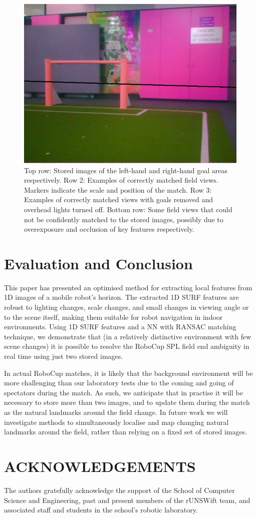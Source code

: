 \documentclass[runningheads,a4paper]{llncs}
\begin{document}
\begin{figure} [h]
\begin{minipage}[b]{0.5\textwidth}
\includegraphics[width=1\textwidth]{figures/img38.png}
\end{minipage}
\caption{Top row: Stored images of the left-hand and right-hand goal areas respectively. Row 2: Examples of correctly matched field views. Markers indicate the scale and position of the match. Row 3: Examples of correctly matched views with goals removed and overhead lights turned off. Bottom row: Some field views that could not be confidently matched to the stored images, possibly due to overexposure and occlusion of key features respectively.} \label{fig:examples}
\end{figure}



\section{Evaluation and Conclusion} \label{sec:conclusions}
This paper has presented an optimised method for extracting local features from 1D images of a mobile robot's horizon. The extracted 1D SURF features are robust to lighting changes, scale changes, and small changes in viewing angle or to the scene itself, making them suitable for robot navigation in indoor environments. Using 1D SURF features and a NN with RANSAC matching technique, we demonstrate that (in a relatively distinctive environment with few scene changes) it is possible to resolve the RoboCup SPL field end ambiguity in real time using just two stored images. 

In actual RoboCup matches, it is likely that the background environment will be more challenging than our laboratory tests due to the coming and going of spectators during the match. As such, we anticipate that in practise it will be necessary to store more than two images, and to update them during the match as the natural landmarks around the field change. In future work we will investigate methods to simultaneously localise and map changing natural landmarks around the field, rather than relying on a fixed set of stored images.

\section{ACKNOWLEDGEMENTS}
The authors gratefully acknowledge the support of the School of Computer Science and Engineering, past and present members of the rUNSWift team, and associated staff and students in the school's robotic laboratory.



\end{document}
